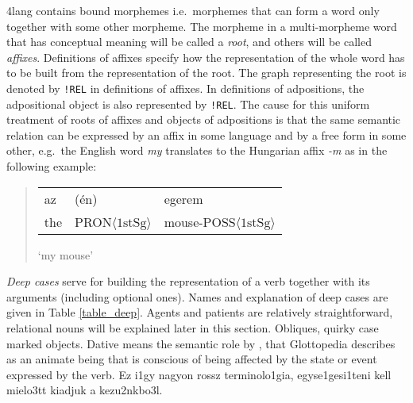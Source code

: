 \documentclass[a4paper,10pt]{article}
\begin{document}
4lang contains bound morphemes i.e.\ morphemes that can form a word only
together with some other morpheme. The morpheme in a multi-morpheme word that
has conceptual meaning will be called a \emph{root}, and others will be called
\emph{affixes}. Definitions of affixes specify how the representation of the whole
word has to be built from the representation of the root. The graph
representing the root is denoted by \texttt{!REL} in definitions of
affixes. In definitions of adpositions, the adpositional object is also represented by \texttt{!REL}. The cause for this uniform treatment of roots of affixes and objects of adpositions is that the same semantic relation can be
expressed by an affix in some language and by a free form in some other,
e.g.\ the English word \emph{my} translates to the Hungarian affix
\emph{-m} as in the following example:
\begin{quote}
\begin{tabular}{lll}
    az & (én) & egerem
\\ the & PRON$\langle\text{1stSg}\rangle$ & mouse-POSS$\langle \text{1stSg}\rangle$
\end{tabular} 

`my mouse'
\end{quote}

\emph{Deep cases} serve for building the representation of a verb together with its
arguments (including optional ones). Names and explanation of deep cases are
given in Table \ref{table_deep}.  Agents and patients are relatively
straightforward, relational nouns will be explained later in this
section. Obliques, quirky case marked objects. %
{{Dative means
    the semantic role by \cite{Fillmore:1968}, that Glottopedia describes as
    an animate being that is conscious of being affected by the state or event
    expressed by the verb.}}
 {\color{red} Ez i1gy nagyon rossz terminolo1gia, 
egyse1gesi1teni kell mielo3tt kiadjuk a kezu2nkbo3l.} 

% 
\end{document}
